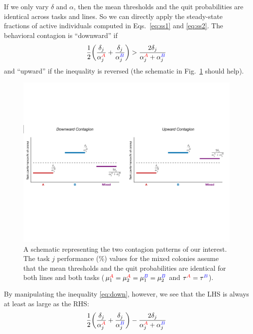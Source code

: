 \documentclass[11pt]{article}
\newcommand{\A}{{\color{red}A}}
\newcommand{\B}{{\color{blue}B}}
\begin{document}
\begin{appendices}
If we only vary $\delta$ and $\alpha$, then the mean thresholds and the quit probabilities are identical across tasks and lines. So we can directly apply the steady-state fractions of active individuals computed in Eqs.~\eqref{eq:ss1} and \eqref{eq:ss2}. The behavioral contagion is ``downward'' if
\begin{equation}
    \frac{1}{2} \bigg( \frac{\delta_j}{\alpha_j^{\A}} + \frac{\delta_j}{\alpha_j^{\B}} \bigg) > \frac{2\delta_j}{\alpha_j^{\A} + \alpha_j^{\B}} \label{eq:down}
\end{equation}
and ``upward'' if the inequality is reversed (the schematic in Fig.~\ref{fig:schematic} should help).
\begin{figure}[H]
    \centering
    \includegraphics[width=0.9\linewidth]{doc/schematic_contagion.pdf}
    \caption{A schematic representing the two contagion patterns of our interest. The task $j$ performance (\%) values for the mixed colonies assume that the mean thresholds and the quit probabilities are identical for both lines and both tasks ($\mu_1^{\A} = \mu_2^{\A} = \mu_1^{\B} = \mu_2^{\B}$ and $\tau^{\A} = \tau^{\B}$).}
    \label{fig:schematic}
\end{figure}
\noindent By manipulating the inequality \eqref{eq:down}, however, we see that the LHS is always at least as large as the RHS:
\begin{align}
    \frac{1}{2} \bigg( \frac{\delta_j}{\alpha_j^{\A}} + \frac{\delta_j}{\alpha_j^{\B}} \bigg) - \frac{2\delta_j}{\alpha_j^{\A} + \alpha_j^{\B}} 

\end{align}
\end{appendices}
\end{document}
